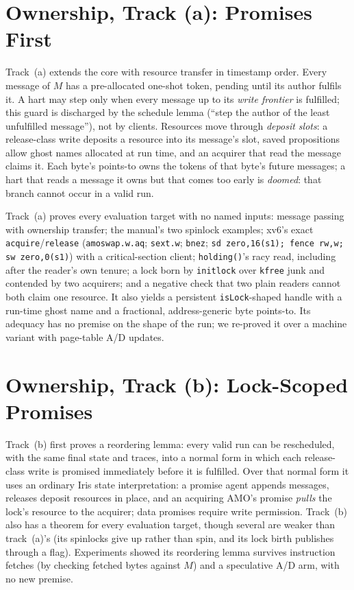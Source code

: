\documentclass[sigplan,screen,nonacm]{acmart}
\newcommand{\code}[1]{\texttt{#1}}
\begin{document}
\section{Ownership, Track (a): Promises First}

Track~(a) extends the core with resource transfer in timestamp order. Every message of $M$ has a pre-allocated
one-shot token, pending until its author fulfils it. A hart may step only when every message up to its \emph{write
frontier} is fulfilled; this guard is discharged by the schedule lemma (``step the author of the least unfulfilled
message''), not by clients. Resources move through \emph{deposit slots}: a release-class write deposits a resource
into its message's slot, saved propositions allow ghost names allocated at run time, and an acquirer that read the
message claims it. Each byte's points-to owns the tokens of that byte's future messages; a hart that reads a message
it owns but that comes too early is \emph{doomed}: that branch cannot occur in a valid run.

Track~(a) proves every evaluation target with no named inputs: message passing with ownership transfer; the manual's
two spinlock examples; xv6's exact \code{acquire}/\code{release} (\code{amoswap.w.aq}; \code{sext.w}; \code{bnez};
\code{sd zero,16(s1); fence rw,w; sw zero,0(s1)}) with a critical-section client; \code{holding()}'s racy read,
including after the reader's own tenure; a lock born by \code{initlock} over \code{kfree} junk and contended by two
acquirers; and a negative check that two plain readers cannot both claim one resource. It also yields a persistent
\code{isLock}-shaped handle with a run-time ghost name and a fractional, address-generic byte points-to. Its adequacy
has no premise on the shape of the run; we re-proved it over a machine variant with page-table A/D updates.

\section{Ownership, Track (b): Lock-Scoped Promises}

Track~(b) first proves a reordering lemma: every valid run can be rescheduled, with the same final state and traces,
into a normal form in which each release-class write is promised immediately before it is fulfilled. Over that normal
form it uses an ordinary Iris state interpretation: a promise agent appends messages, releases deposit resources in
place, and an acquiring AMO's promise \emph{pulls} the lock's resource to the acquirer; data promises require write
permission. Track~(b) also has a theorem for every evaluation target, though several are weaker than track~(a)'s
(its spinlocks give up rather than spin, and its lock birth publishes through a flag). Experiments showed its
reordering lemma survives
instruction fetches (by checking fetched bytes against $M$) and a speculative A/D arm, with no new premise.
\end{document}
